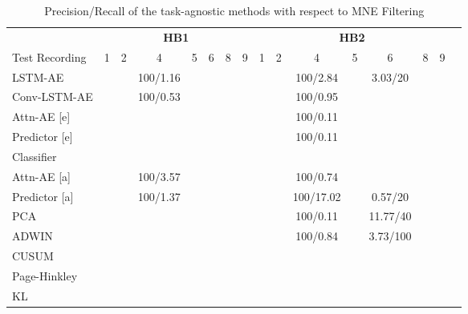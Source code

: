 \begin{table}[btp]
\centering
\caption{Precision/Recall of the task-agnostic methods with respect to MNE Filtering}
\label{tab7}

\begin{tabular}{lccccccccccccccc}
\toprule
          & \multicolumn{7}{c}{\textbf{HB1}} & \multicolumn{7}{c}{\textbf{HB2}} \\
\cmidrule(lr){2-8}\cmidrule(lr){9-15}
Test Recording & 1 & 2 & 4 & 5 & 6 & 8 & 9 & 1 & 2 & 4 & 5 & 6 & 8 & 9 \\
\cmidrule(lr){2-8}\cmidrule(lr){9-15}
LSTM-AE  & &   &  100/1.16     &       &       &       &       &       &  &   100/2.84    &   &  3.03/20 &       &         \\
Conv-LSTM-AE & &     &   100/0.53    &  &       &       &       &       &       &   100/0.95    &       &      &       &         \\
\midrule
Attn-AE [e]& &     &       &       &       &       &       &       &       &   100/0.11    &       &       &       &         \\
Predictor [e]  &&     &       &       &       &       &       &       &       &   100/0.11    &       &       &       &         \\
Classifier  &&     &       &       &       &       &       &       &       &       &       &       &       &         \\
\midrule
Attn-AE [a] & & & 100/3.57 &  &  & & & & & 100/0.74 &  & & & \\
Predictor [a]  & &    & 100/1.37  &       &       &       &       &    &    &   100/17.02    &    & 0.57/20  &       &         \\
\midrule
PCA      &   &     &       &   &    &    &    &   &    &  100/0.11 &  & 11.77/40 &    &     \\
ADWIN      &   &     &       &     &       &     &       &  &   &    100/0.84   &   & 3.73/100 &   &         \\
CUSUM      &   &     &       &    &       &    &       &  &    &       &   &  &   &         \\
Page-Hinkley      &   &     &       &    &       &    &       &   &   &       &  &  &    &         \\
KL      &   &     &       &    &       &    &       &   &  &       &  &  &    &         \\
\bottomrule
\end{tabular}

\end{table}


